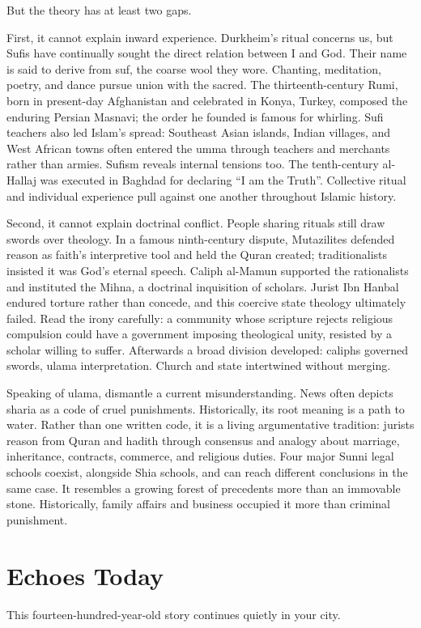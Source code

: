 But the theory has at least two gaps.

First, it cannot explain inward experience. Durkheim's ritual concerns us, but Sufis have continually sought the direct relation between I and God. Their name is said to derive from suf, the coarse wool they wore. Chanting, meditation, poetry, and dance pursue union with the sacred. The thirteenth-century Rumi, born in present-day Afghanistan and celebrated in Konya, Turkey, composed the enduring Persian Masnavi; the order he founded is famous for whirling. Sufi teachers also led Islam's spread: Southeast Asian islands, Indian villages, and West African towns often entered the umma through teachers and merchants rather than armies. Sufism reveals internal tensions too. The tenth-century al-Hallaj was executed in Baghdad for declaring ``I am the Truth''. Collective ritual and individual experience pull against one another throughout Islamic history.

Second, it cannot explain doctrinal conflict. People sharing rituals still draw swords over theology. In a famous ninth-century dispute, Mutazilites defended reason as faith's interpretive tool and held the Quran created; traditionalists insisted it was God's eternal speech. Caliph al-Mamun supported the rationalists and instituted the Mihna, a doctrinal inquisition of scholars. Jurist Ibn Hanbal endured torture rather than concede, and this coercive state theology ultimately failed. Read the irony carefully: a community whose scripture rejects religious compulsion could have a government imposing theological unity, resisted by a scholar willing to suffer. Afterwards a broad division developed: caliphs governed swords, ulama interpretation. Church and state intertwined without merging.

Speaking of ulama, dismantle a current misunderstanding. News often depicts sharia as a code of cruel punishments. Historically, its root meaning is a path to water. Rather than one written code, it is a living argumentative tradition: jurists reason from Quran and hadith through consensus and analogy about marriage, inheritance, contracts, commerce, and religious duties. Four major Sunni legal schools coexist, alongside Shia schools, and can reach different conclusions in the same case. It resembles a growing forest of precedents more than an immovable stone. Historically, family affairs and business occupied it more than criminal punishment.

\section{Echoes Today}
This fourteen-hundred-year-old story continues quietly in your city.

